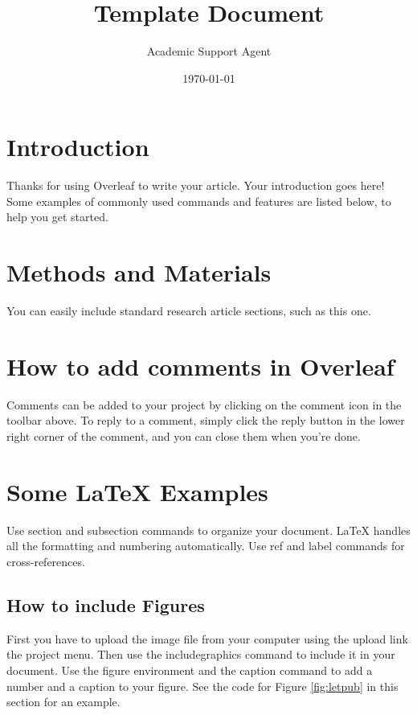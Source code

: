 \documentclass{article}
\title{Template Document}
\author{Academic Support Agent}
\date{\today}
\begin{document}
\maketitle

\flushbottom
\maketitle
\thispagestyle{empty}

\section*{Introduction}

Thanks for using Overleaf to write your article. Your introduction goes here! Some examples of commonly used commands and features are listed below, to help you get started.

\section*{Methods and Materials}

You can easily include standard research article sections, such as this one.

\section*{How to add comments in Overleaf}

Comments can be added to your project by clicking on the comment icon in the toolbar above. %
%
%
To reply to a comment, simply click the reply button in the lower right corner of the comment, and you can close them when you're done.

\section*{Some \LaTeX{} Examples}
\label{sec:examples}

Use section and subsection commands to organize your document. \LaTeX{} handles all the formatting and numbering automatically. Use ref and label commands for cross-references.

\subsection*{How to include Figures}

First you have to upload the image file from your computer using the upload link the project menu. Then use the includegraphics command to include it in your document. Use the figure environment and the caption command to add a number and a caption to your figure. See the code for Figure \ref{fig:letpub} in this section for an example.
\end{document}
